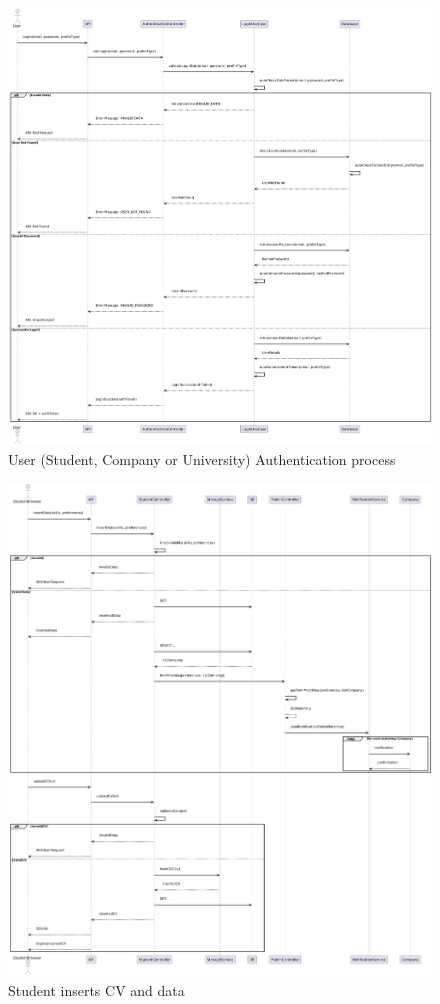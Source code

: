\begin{figure}[ht!]
    \centering
    \includegraphics[scale=0.80]{Images/ImagesSequenceDiagram/LoginAuthentication.png}
    \caption{User (Student, Company or University) Authentication process}
\end{figure}

\newpage

\begin{figure}[ht!]
    \centering
    \includegraphics[scale=0.3]{Images/ImagesSequenceDiagram/StudentUploadCV.png}
    \caption{Student inserts CV and data}
\end{figure}

